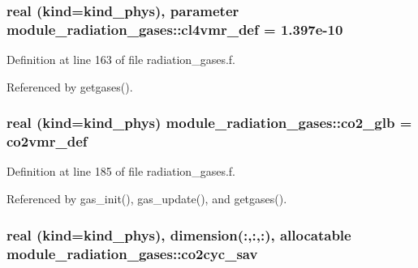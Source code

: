 \subsubsection[{\texorpdfstring{cl4vmr\+\_\+def}{cl4vmr_def}}]{\setlength{\rightskip}{0pt plus 5cm}real (kind=kind\+\_\+phys), parameter module\+\_\+radiation\+\_\+gases\+::cl4vmr\+\_\+def = 1.\+397e-\/10\hspace{0.3cm}{\ttfamily [private]}}\hypertarget{group__module__radiation__gases_ga013f8faaee6df0c7c032e1786770c110}{}\label{group__module__radiation__gases_ga013f8faaee6df0c7c032e1786770c110}


Definition at line 163 of file radiation\+\_\+gases.\+f.



Referenced by getgases().

\subsubsection[{\texorpdfstring{co2\+\_\+glb}{co2_glb}}]{\setlength{\rightskip}{0pt plus 5cm}real (kind=kind\+\_\+phys) module\+\_\+radiation\+\_\+gases\+::co2\+\_\+glb = co2vmr\+\_\+def\hspace{0.3cm}{\ttfamily [private]}}\hypertarget{group__module__radiation__gases_ga0398d6837c9e8c41359e76a754147002}{}\label{group__module__radiation__gases_ga0398d6837c9e8c41359e76a754147002}


Definition at line 185 of file radiation\+\_\+gases.\+f.



Referenced by gas\+\_\+init(), gas\+\_\+update(), and getgases().

\subsubsection[{\texorpdfstring{co2cyc\+\_\+sav}{co2cyc_sav}}]{\setlength{\rightskip}{0pt plus 5cm}real (kind=kind\+\_\+phys), dimension(\+:,\+:,\+:), allocatable module\+\_\+radiation\+\_\+gases\+::co2cyc\+\_\+sav\hspace{0.3cm}{\ttfamily [private]}}\hypertarget{group__module__radiation__gases_ga3985e306e5555089909fd42a4cc93afb}{}\label{group__module__radiation__gases_ga3985e306e5555089909fd42a4cc93afb}


